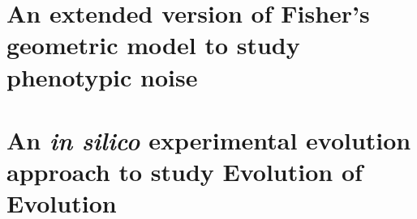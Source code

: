 \documentclass[a4paper,12pt,onecolumn]{template}
\begin{document}






\clearemptydoublepage


\clearemptydoublepage


\clearemptydoublepage


\tableofcontents
{}

\clearemptydoublepage

\listoffigures
{}

\clearemptydoublepage

\listoftables
{}

\clearemptydoublepage








\part{An extended version of Fisher's geometric model to study phenotypic noise}
\label{part1}




\part{An \textit{in silico} experimental evolution approach to study Evolution of Evolution}
\label{part2}






\end{document}
